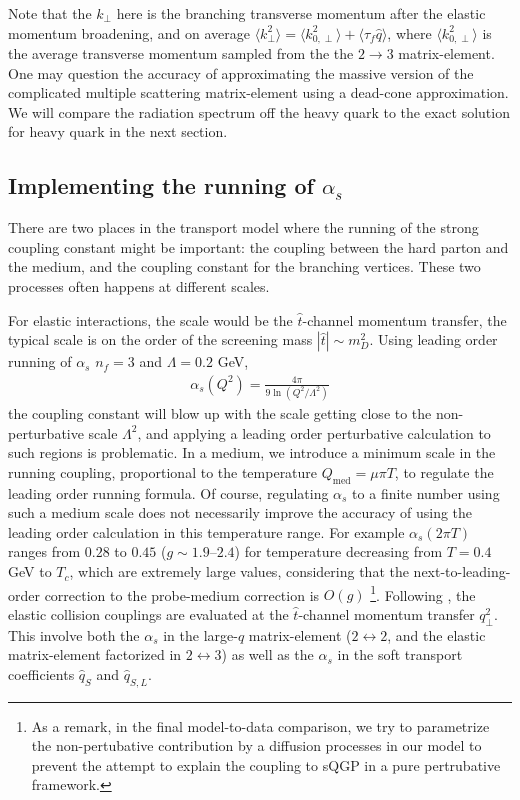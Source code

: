 Note that the $k_\perp$ here is the branching transverse momentum after the elastic momentum broadening, and on average $\langle k_\perp^2 \rangle = \langle k_{0,\perp}^2 \rangle + \langle\tau_f\hat{q}\rangle$, where $\langle k_{0,\perp}^2 \rangle$ is the average transverse momentum sampled from the the $2\rightarrow 3$ matrix-element.
One may question the accuracy of approximating the massive version of the complicated multiple scattering matrix-element using a dead-cone approximation.
We will compare the radiation spectrum off the heavy quark to the exact solution for heavy quark in the next section.

\subsection{Implementing the running of $\alpha_s$}
There are two places in the transport model where the running of the strong coupling constant might be important:
the coupling between the hard parton and the medium, and the coupling constant for the branching vertices.
These two processes often happens at different scales.

For elastic interactions, the scale would be the $\hat{t}$-channel momentum transfer, the typical scale is on the order of the screening mass $|\hat{t}| \sim m_D^2$.  
Using leading order running of $\alpha_s$ $n_f = 3$ and $\Lambda = 0.2$ GeV, 
\begin{eqnarray}
\alpha_s(Q^2) = \frac{4\pi}{9\ln\left(Q^2/\Lambda^2\right)}
\end{eqnarray}
the coupling constant will blow up with the scale getting close to the non-perturbative scale $\Lambda^2$, and applying a leading order perturbative calculation to such regions is problematic. 
In a medium, we introduce a minimum scale in the running coupling, proportional to the temperature $Q_{\textrm{med}} = \mu \pi T$, to regulate the leading order running formula.
Of course, regulating $\alpha_s$ to a finite number using such a medium scale does not necessarily improve the accuracy of using the leading order  calculation in this temperature range. 
For example $\alpha_s(2\pi T)$ ranges from $0.28$ to $0.45$ ($g \sim 1.9$--$2.4$) for temperature decreasing from $T=0.4$ GeV to $T_c$, which are extremely large values, considering that the next-to-leading-order correction to the probe-medium correction is $O(g)$  
\footnote{\singlespacing As a remark, in the final model-to-data comparison, we try to parametrize the non-pertubative contribution by a diffusion processes in our model to prevent the attempt to explain the coupling to sQGP in a pure pertrubative framework.}.
Following \cite{Arnold:2008zu}, the elastic collision couplings are evaluated at the $\hat{t}$-channel momentum transfer $q_\perp^2$.
This involve both the $\alpha_s$ in the large-$q$ matrix-element ($2\leftrightarrow 2$, and the elastic matrix-element factorized in $2\leftrightarrow 3$) as well as the $\alpha_s$ in the soft transport coefficients $\hat{q}_S$ and $\hat{q}_{S, L}$.

